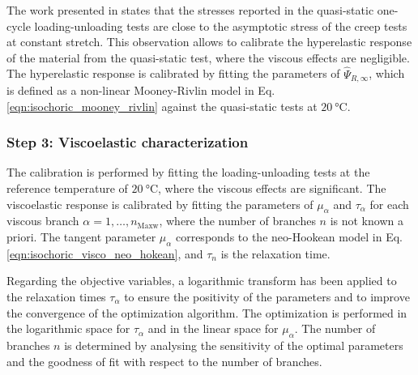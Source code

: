 The work presented in \cite{Liao_Mokarram2020} states that the stresses reported in the quasi-static one-cycle loading-unloading tests are close to the asymptotic stress of the creep tests at constant stretch. This observation allows to calibrate the hyperelastic response of the material from the quasi-static test, where the viscous effects are negligible. The hyperelastic response is calibrated by fitting the parameters of $\hat\Psi_{R,\infty}$, which is defined as a non-linear Mooney-Rivlin model in Eq. \eqref{eqn:isochoric_mooney_rivlin} against the quasi-static tests at $\SI{20}{\celsius}$.



\subsubsection{Step 3: Viscoelastic characterization}

The calibration is performed by fitting the loading-unloading tests at the reference temperature of $\SI{20}{\celsius}$, where the viscous effects are significant.
The viscoelastic response is calibrated by fitting the parameters of $\mu_\alpha$ and $\tau_\alpha$ for each viscous branch $\alpha=1,\dots,n_\text{Maxw}$, where the number of branches $n$ is not known a priori. The tangent parameter $\mu_\alpha$ corresponds to the neo-Hookean model in Eq. \eqref{eqn:isochoric_visco_neo_hokean}, and $\tau_n$ is the relaxation time.

Regarding the objective variables, a logarithmic transform has been applied to the relaxation times $\tau_\alpha$ to ensure the positivity of the parameters and to improve the convergence of the optimization algorithm. The optimization is performed in the logarithmic space for $\tau_\alpha$ and in the linear space for $\mu_\alpha$. The number of branches $n$ is determined by analysing the sensitivity of the optimal parameters and the goodness of fit with respect to the number of branches.



